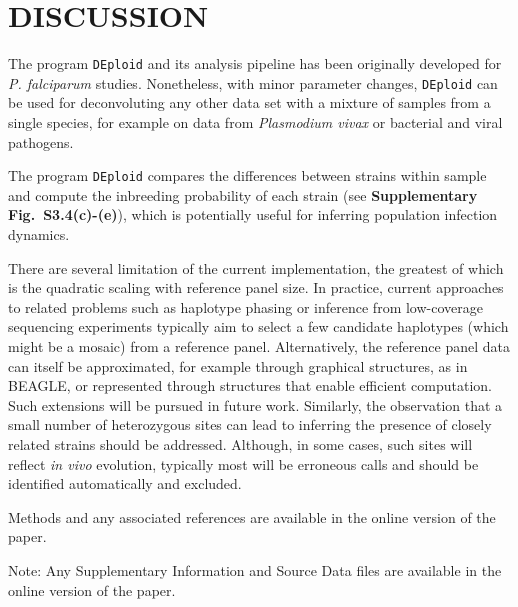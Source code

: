 \documentclass{nature}
\begin{document}
\section*{DISCUSSION}

The program \texttt{DEploid} and its analysis pipeline has been originally developed for {\it P. falciparum} studies. Nonetheless, with minor parameter changes, \texttt{DEploid} can be used for deconvoluting any other data set with a mixture of samples from a single species, for example on data from {\it Plasmodium vivax}\cite{Pearson2016} or bacterial and viral pathogens.

The program \texttt{DEploid} compares the differences between strains within sample and compute the inbreeding probability of each strain (see {\bf Supplementary Fig.~S3.4(c)-(e)}), which is potentially useful for inferring population infection dynamics.

There are several limitation of the current implementation, the greatest of which is the quadratic scaling with reference panel size.  In practice, current approaches to related problems such as haplotype phasing\cite{Delaneau2012} or inference from low-coverage sequencing experiments\cite{Davis2016} typically aim to select a few candidate haplotypes (which might be a mosaic) from a reference panel.  Alternatively, the reference panel data can itself be approximated, for example through graphical structures, as in BEAGLE\cite{Browning2007}, or represented through structures that enable efficient computation\cite{Lunter2016}.  Such extensions will be pursued in future work.  Similarly, the observation that a small number of heterozygous sites can lead to inferring the presence of closely related strains should be addressed. Although, in some cases, such sites will reflect {\it in vivo} evolution, typically most will be erroneous calls and should be identified automatically and excluded.

\begin{methods}
Methods and any associated references are available in the online version of the paper.

\noindent Note: Any Supplementary Information and Source Data files are available in the online version of the paper.
\end{methods}
\end{document}
